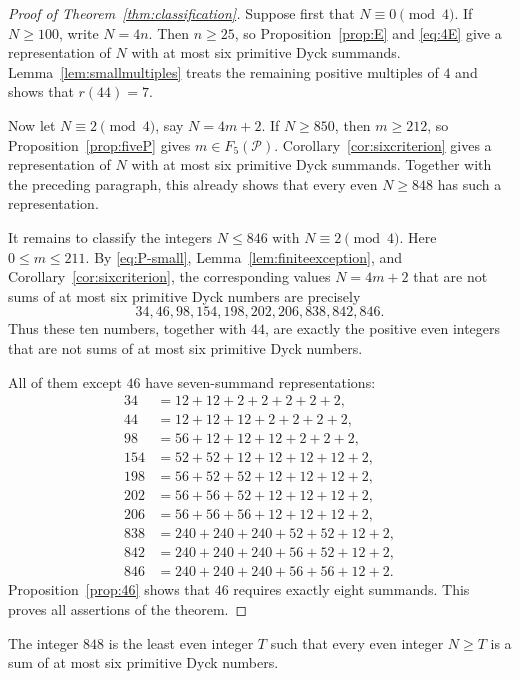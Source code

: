 \documentclass{ws-ijfcs}
\newcommand{\Pset}{\mathcal P}
\begin{document}
\begin{proof}[Proof of Theorem~\ref{thm:classification}]
Suppose first that $N\equiv0\pmod4$.  If $N\geq100$, write $N=4n$.
Then $n\geq25$, so Proposition~\ref{prop:E} and \eqref{eq:4E} give a
representation of $N$ with at most six primitive Dyck summands.
Lemma~\ref{lem:smallmultiples} treats the remaining positive multiples
of $4$ and shows that $r(44)=7$.

Now let $N\equiv2\pmod4$, say $N=4m+2$.  If $N\geq850$, then
$m\geq212$, so Proposition~\ref{prop:fiveP} gives
$m\in F_5(\Pset)$.  Corollary~\ref{cor:sixcriterion} gives a
representation of $N$ with at most six primitive Dyck summands.  Together
with the preceding paragraph, this already shows that every even
$N\geq848$ has such a representation.

It remains to classify the integers $N\leq846$ with
$N\equiv2\pmod4$.  Here $0\leq m\leq211$.  By
\eqref{eq:P-small}, Lemma~\ref{lem:finiteexception}, and
Corollary~\ref{cor:sixcriterion}, the corresponding values $N=4m+2$
that are not sums of at most six primitive Dyck numbers are precisely
\[
 34,46,98,154,198,202,206,838,842,846.
\]
Thus these ten numbers, together with $44$, are exactly the positive even
integers that are not sums of at most six primitive Dyck numbers.

All of them except $46$ have seven-summand representations:
\[
\begin{aligned}
34&=12+12+2+2+2+2+2,\\
44&=12+12+12+2+2+2+2,\\
98&=56+12+12+12+2+2+2,\\
154&=52+52+12+12+12+12+2,\\
198&=56+52+52+12+12+12+2,\\
202&=56+56+52+12+12+12+2,\\
206&=56+56+56+12+12+12+2,\\
838&=240+240+240+52+52+12+2,\\
842&=240+240+240+56+52+12+2,\\
846&=240+240+240+56+56+12+2.
\end{aligned}
\]
Proposition~\ref{prop:46} shows that $46$ requires exactly eight
summands.  This proves all assertions of the theorem.
\end{proof}

\begin{corollary}\label{cor:threshold}
The integer $848$ is the least even integer $T$ such that every even
integer $N\geq T$ is a sum of at most six primitive Dyck numbers.
\end{corollary}
\end{document}
